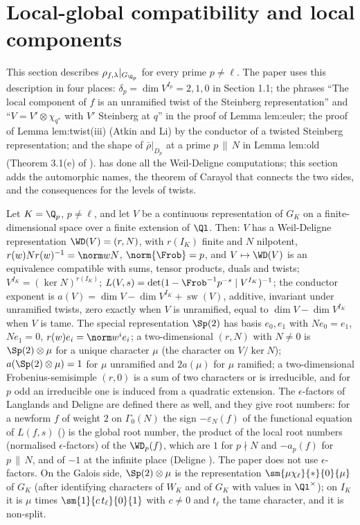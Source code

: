 \section[Local-global compatibility]{Local-global compatibility and local components}\label{sec:modgalrep:local}

This section describes $\rho_{f,\lambda}|_{G_{\Q_p}}$ for every prime $p\ne\ell$. The paper uses this description in four places: $\delta_p=\dim V^{I_p}=2,1,0$ in Section
1.1; the phrases ``The local component of $f$ is an unramified twist of the Steinberg representation'' and ``$V=V'\otimes\chi_{q^*}$ with $V'$ Steinberg at $q$''
in the proof of Lemma lem:euler; the proof of Lemma lem:twist(iii) (Atkin and Li) by the conductor of a twisted Steinberg representation; and the
shape of $\bar\rho|_{D_p}$ at a prime $p\,\|\,N$ in Lemma lem:old (Theorem 3.1(e) of \cite{DDT}).  has done all the Weil-Deligne
computations; this section adds the automorphic names, the theorem of Carayol that connects the two sides, and the consequences for the
levels of twists.

\begin{remark}\label{rem:modgalrep:wd-recap}
Let $K=\Q_p$, $p\ne\ell$, and let $V$ be a continuous representation of $G_K$ on a finite-dimensional space over a finite extension of $\Ql$. Then:
$V$ has a Weil-Deligne representation $\WD(V)=(r,N)$, with $r(I_K)$ finite and $N$ nilpotent, $r(w)Nr(w)^{-1}=\norm wN$, $\norm{\Frob}=p$, and $V\mapsto\WD(V)$ is an
equivalence compatible with sums, tensor products, duals and twists; $V^{I_K}=(\ker N)^{r(I_K)}$; $L(V,s)=\det(1-\Frob^{-1}p^{-s}\mid V^{I_K})^{-1}$; the conductor
exponent is $a(V)=\dim V-\dim V^{I_K}+\operatorname{sw}(V)$, additive, invariant under unramified twists, zero exactly when $V$ is unramified, equal to
$\dim V-\dim V^{I_K}$ when $V$ is tame. The special representation $\Sp(2)$ has basis $e_0,e_1$ with $Ne_0=e_1$, $Ne_1=0$, $r(w)e_i=\norm w^ie_i$; a two-dimensional
$(r,N)$ with $N\ne0$ is $\Sp(2)\otimes\mu$ for a unique character $\mu$ (the character on $V/\ker N$); $a(\Sp(2)\otimes\mu)=1$ for $\mu$ unramified and $2a(\mu)$ for $\mu$
ramified; a two-dimensional Frobenius-semisimple $(r,0)$ is a sum of two characters or is irreducible, and for $p$ odd an irreducible one is
induced from a quadratic extension. The $\epsilon$-factors of Langlands and Deligne are defined there as well, and they give root numbers: for a newform
$f$ of weight $2$ on $\Gamma_0(N)$ the sign $-\varepsilon_N(f)$ of the functional equation of $L(f,s)$ () is the global root number, the product of
the local root numbers (normalised $\epsilon$-factors) of the $\WD_p(f)$, which are $1$ for $p\nmid N$ and $-a_p(f)$ for $p\,\|\,N$, and of $-1$ at the infinite place (Deligne
\cite{Deligne73}). The paper does not use $\epsilon$-factors.
On the Galois side, $\Sp(2)\otimes\mu$ is the representation $\sm{\mu\chi_\ell}{*}{0}{\mu}$ of $G_K$ (after identifying characters of $W_K$ and of $G_K$ with values
in $\Ql^\times$); on $I_K$ it is $\mu$ times $\sm{1}{c\,t_\ell}{0}{1}$ with $c\ne0$ and $t_\ell$ the tame character, and it is non-split.
\end{remark}

